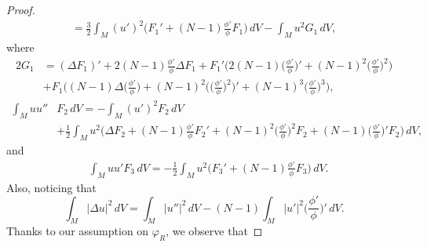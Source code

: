 \documentclass[10pt,leqno]{amsart}
\numberwithin{equation}{section}
\begin{document}
\begin{proof}
\begin{align*}
=\frac{3}{2} \int_M (u')^2 \big(F_1 ' + (N-1)\frac{\phi'}{\phi} F_1\big)\,dV - \int_M u^2 G_1\, dV,
\end{align*}
where
\begin{align*}
2G_1&= (\Delta F_1)' + 2(N-1)\frac{\phi'}{\phi} \Delta F_1 +F_1 ' \big(2(N-1) \big(\frac{\phi'}{\phi}\big)' + (N-1)^2 \big(\frac{\phi'}{\phi}\big)^2 \big) \\
&+F_1 \big((N-1) \Delta \big(\frac{\phi'}{\phi}\big) + (N-1)^2  \big(\big(\frac{\phi'}{\phi}\big)^2\big)' + (N-1)^3 \big(\frac{\phi'}{\phi}\big)^3 \big),
\end{align*}
\begin{align*}
\int_M u u''& F_2\, dV
=   -\int_M (u')^2 F_2\, dV \\
& + \frac{1}{2} \int_M u^2 \big(\Delta F_2 +(N-1)\frac{\phi'}{\phi} F_2 ' +(N-1)^2 \big(\frac{\phi'}{\phi}\big)^2 F_2 + (N-1) \big(\frac{\phi'}{\phi}\big)' F_2 \big)\,dV,
\end{align*}
and
\begin{align*}
&\int_M u u' F_3\, dV
=  -  \frac{1}{2}\int_M u^2  \big(F_3 '+ (N-1)\frac{\phi'}{\phi} F_3 \big)\,dV.
\end{align*}
Also, noticing that
$$\int_M |\Delta u|^2\, dV= \int_M |u''|^2\, dV - (N-1) \int_M |u'|^2 \big(\frac{\phi'}{\phi}\big)'\, dV.$$
Thanks to our assumption on $\varphi_R$, we observe that

\end{proof}
\end{document}
